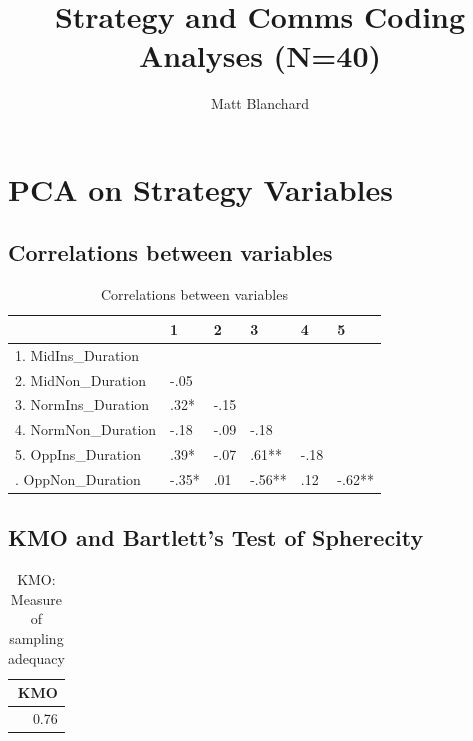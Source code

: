 \documentclass[]{article}
\title{Strategy and Comms Coding Analyses (N=40)}
\author{Matt Blanchard}
\date{}
\begin{document}
\maketitle

\hypertarget{pca-on-strategy-variables}{%
\section{PCA on Strategy Variables}\label{pca-on-strategy-variables}}

\hypertarget{correlations-between-variables}{%
\subsection{Correlations between
variables}\label{correlations-between-variables}}

\begin{table}[H]

\caption{\label{tab:unnamed-chunk-2}Correlations between variables}
\centering
\fontsize{6}{8}\selectfont
\begin{tabular}[t]{llllll}
\toprule
  & 1 & 2 & 3 & 4 & 5\\
\midrule
1. MidIns\_Duration &  &  &  &  & \\
2. MidNon\_Duration & -.05 &  &  &  & \\
3. NormIns\_Duration & .32* & -.15 &  &  & \\
4. NormNon\_Duration & -.18 & -.09 & -.18 &  & \\
5. OppIns\_Duration & .39* & -.07 & .61** & -.18 & \\
\addlinespace
6. OppNon\_Duration & -.35* & .01 & -.56** & .12 & -.62**\\
\bottomrule
\end{tabular}
\end{table}

\hypertarget{kmo-and-bartletts-test-of-spherecity}{%
\subsection{KMO and Bartlett's Test of
Spherecity}\label{kmo-and-bartletts-test-of-spherecity}}

\begin{table}[H]

\caption{\label{tab:unnamed-chunk-4}KMO: Measure of sampling adequacy}
\centering
\fontsize{6}{8}\selectfont
\begin{tabular}[t]{r}
\toprule
KMO\\
\midrule
0.76\\
\bottomrule
\end{tabular}
\end{table}
\end{document}
